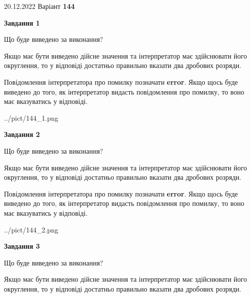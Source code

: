 \documentclass[12pt, ukrainian]{article}
\begin{document}
{20.12.2022 Варіант \No \textbf { 144 }\par}
{
\begin {Large}

{\begin {center}\textbf{Завдання 1}\end {center}}\par
Що буде виведено за виконання? \par

Якщо має бути виведено дійсне значення та інтерпретатор має здійснювати його округлення, 
то у відповіді достатньо правильно вказати два дробових розряди.

Повідомлення інтерпретатора про помилку позначати \textbf{error}.
Якщо щось буде виведено до того, як інтерпретатор видасть повідомлення про помилку, 
то воно має вказуватись у відповіді. \par

\begin{center}
	{../pict/144_1.png}
\end{center}
\newpage

{\begin {center}\textbf{Завдання 2}\end {center}}\par
Що буде виведено за виконання? \par

Якщо має бути виведено дійсне значення та інтерпретатор має здійснювати його округлення, 
то у відповіді достатньо правильно вказати два дробових розряди.

Повідомлення інтерпретатора про помилку позначати \textbf{error}.
Якщо щось буде виведено до того, як інтерпретатор видасть повідомлення про помилку, 
то воно має вказуватись у відповіді. \par

\begin{center}
	{../pict/144_2.png}
\end{center}
\newpage

{\begin {center}\textbf{Завдання 3}\end {center}}\par
Що буде виведено за виконання? \par

Якщо має бути виведено дійсне значення та інтерпретатор має здійснювати його округлення, 
то у відповіді достатньо правильно вказати два дробових розряди.


\end{Large}}
\end{document}

